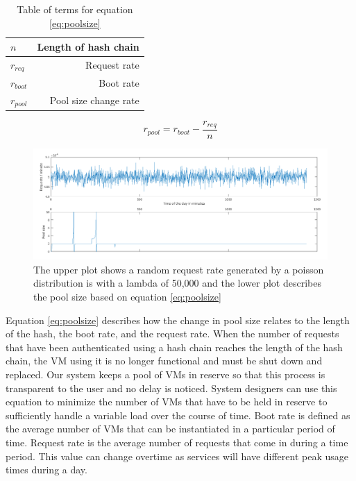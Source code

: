 \documentclass[a4paper,twoside]{article}
\begin{document}
\begin{table}
	

\begin{center}
	\begin{tabular}{ | l | r |}
		\hline
		$n$ & Length of hash chain \\ \hline 
		$r_{req}$ & Request rate  \\ \hline
		$r_{boot}$ & Boot rate  \\ \hline
		$r_{pool}$ & Pool size change rate\\
		\hline
		
	\end{tabular}
	
	\label{tab:terms}
\end{center}
\caption{Table of terms for equation \ref{eq:poolsize}}
\end{table}

\begin{equation} 
 r_{pool} = r_{boot} - \frac{r_{req}}{n}
 \label{eq:poolsize}
\end{equation}
\begin{figure}[!ht]
  \centering
  \includegraphics[keepaspectratio=true,scale=0.375]{poolsize}
\caption{The upper plot shows a random request rate generated by a poisson distribution is with a lambda of 50,000 and the lower plot describes the pool size based on equation \ref{eq:poolsize}}
\label{fig:poolsize}
\end{figure}

Equation \ref{eq:poolsize} describes how the change in pool size relates to the length of the hash, the boot rate, and the request rate.   When the number of requests that have been authenticated using a hash chain reaches the length of the hash chain, the VM using it is no longer functional and must be shut down and replaced.  Our system keeps a pool of VMs in reserve so that this process is transparent to the user and no delay is noticed.  System designers can use this equation to minimize the number of VMs that have to be held in reserve to sufficiently handle a variable load over the course of time.  Boot rate is defined as the average number of VMs that can be instantiated in a particular period of time.  Request rate is the average number of requests that come in during a time period.  This value can change overtime as services will have different peak usage times during a day.   
\end{document}
